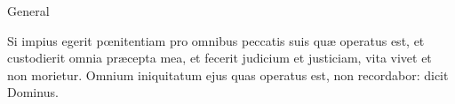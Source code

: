 \begin{multicols}{2}
\begin{inhead}
General
\end{inhead}\noindent
	Si impius egerit p{\oe}nitentiam pro omnibus peccatis suis qu{\ae} operatus est, et custodierit omnia pr{\ae}cepta mea, et fecerit judicium et justiciam, vita vivet et non morietur. Omnium iniquitatum ejus quas operatus est, non recordabor: dicit Dominus.
	

\end{multicols}
